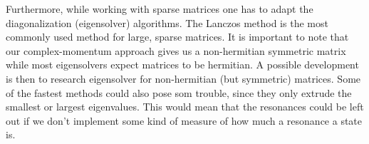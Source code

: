 \documentclass[../main/report.tex]{subfiles}
\begin{document}
Furthermore, while working with sparse matrices one has to adapt the diagonalization (eigensolver) algorithms. 
The Lanczos method is the most commonly used method for large, sparse matrices.
It is important to note that our complex-momentum approach gives us a non-hermitian symmetric matrix while most eigensolvers expect matrices to be hermitian. A possible development is then to research eigensolver for non-hermitian (but symmetric) matrices.
Some of the fastest methods could also pose som trouble, since they only extrude the smallest or largest eigenvalues.
This would mean that the resonances could be left out if we don't implement some kind of measure of how much a resonance a state is. 
\end{document}
